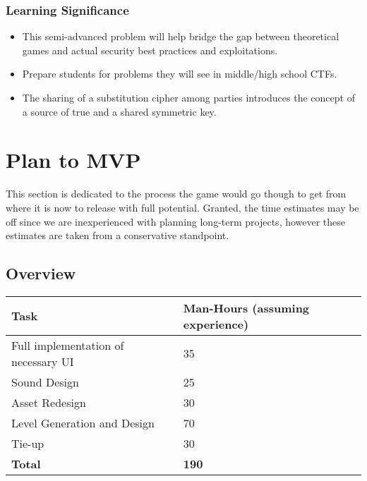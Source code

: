 \documentclass{article}
\begin{document}
\subsubsection{Learning Significance}

\begin{itemize}
  \item This semi-advanced problem will help bridge the gap between
    theoretical games and actual security best practices and exploitations.
  \item Prepare students for problems they will see in middle/high school CTFs.
  \item The sharing of a substitution cipher among parties introduces the concept of
  a source of true and a shared symmetric key.
\end{itemize}

\section{Plan to MVP}

This section is dedicated to the process the game would go
though to get from where it is now to release with full
potential. Granted, the time estimates may be off since
we are inexperienced with planning long-term projects, however these estimates
are taken from a conservative standpoint.

\subsection{Overview}

\begin{table}[h]
\begin{tabular}{l|l}
\textbf{Task}                       & \textbf{Man-Hours (assuming experience)} \\ \hline
Full implementation of necessary UI & 35                                                 \\ \hline
Sound Design                        & 25                                                 \\ \hline
Asset Redesign                      & 30                                              \\ \hline
Level Generation and Design         & 70                                                 \\ \hline
Tie-up                              & 30                                               \\ \hline
\textbf{Total}                      & \textbf{190}                                              \\ 
\end{tabular}
\end{table}
\end{document}
